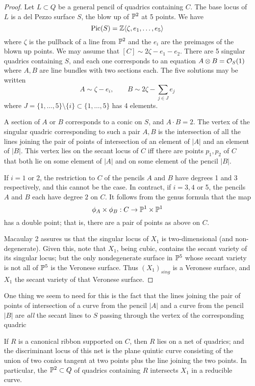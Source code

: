 \begin{proof}
Let $L\subset Q$ be a general pencil of quadrics containing $C$. The base locus of $L$ is a del Pezzo surface $S$, the blow up of
$\PP^2$ at 5 points. We have
$$
\Pic(S) = \ZZ\langle \zeta, e_1,\dots, e_5\rangle
$$
where $\zeta$ is the pullback of a line from $\PP^2$ and the $e_i$ are the preimages of the blown up points. We may assume
that $[C]\sim 2\zeta-e_1-e_2$. There are 5 singular quadrics containing $S$, and each one corresponds to an equation
$A\otimes B = \cO_S(1)$ where $A,B$ are line bundles with two sections each. The five solutions may be written
$$
A \sim \zeta-e_i,\qquad B \sim 2\zeta - \sum_{j\in J}e_j
$$
where $J = \{1,\dots,5\} \setminus \{i\} \subset \{1,\dots,5\}$ has 4 elements. 

A section of $A$ or $B$ corresponds to a conic on $S$, and $A\cdot B = 2$.
The vertex of the singular quadric corresponding to such a pair $A,B$ is the intersection of all the lines joining the pair of points of intersection
of an element of $|A|$ and an element of $|B|$. This vertex lies on the secant locus of $C$ iff there are points $p_1,p_2$ of $C$ that both lie on some element of $|A|$ and on some element of the pencil $|B|$. 

If $i = 1$ or 2, the restriction to $C$ of the pencils $A$ and $B$ have degrees 1 and 3 respectively, and this cannot be the case. In contract, if $i = 3, 4$ or 5, the pencils $A$ and $B$ each have degree $2$ on $C$. It follows from the genus formula that the map 
$$
\phi_A \times \phi_B : C \to \PP^1 \times \PP^1
$$
has a double point; that is, there are a pair of points as above on $C$.

Macaulay 2 assures us that the singular locus of $X_1$ is two-dimensional (and non-degenerate). Given this, note that $X_1$, being cubic, contains the secant variety of its singular locus; but the only nondegenerate surface in $\PP^5$ whose secant variety is not all of $\PP^5$ is the Veronese surface. Thus $(X_1)_{sing}$ is a Veronese surface, and $X_1$ the secant variety of that Veronese surface.
\end{proof}

One thing we seem to need for this is the fact that the lines joining the pair of points of intersection of a curve from the pencil $|A|$ and a curve from the pencil $|B|$ are \emph{all} the secant lines to $S$ passing through the vertex of the corresponding quadric

\begin{proposition}
 If $R$ is a canonical ribbon supported on $C$, then $R$ lies on a net of quadrics; and the discriminant locus of this net is the plane quintic curve consisting of the union of two conics tangent at two points plus the line joining the two points. In particular, the $\PP^2 \subset Q$ of quadrics containing $R$ intersects $X_1$ in a reducible curve.
\end{proposition}


